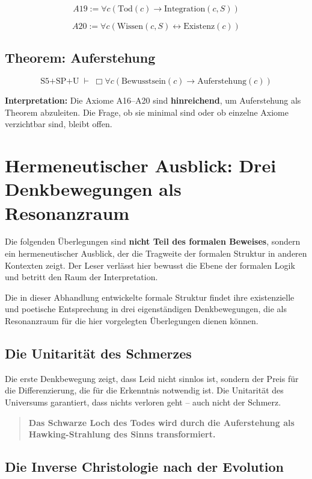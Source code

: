 \documentclass[
]{article}
\begin{document}
\[
\boxed{A19 := \forall c(\text{Tod}(c) \rightarrow \text{Integration}(c, S))}
\]

\[
\boxed{A20 := \forall c(\text{Wissen}(c, S) \leftrightarrow \text{Existenz}(c))}
\]

\subsection{Theorem: Auferstehung}

\[
\boxed{\text{S5+SP+U} \;\vdash\; \Box\forall c(\text{Bewusstsein}(c) \rightarrow \text{Auferstehung}(c))}
\]

\textbf{Interpretation:} Die Axiome A16–A20 sind \textbf{hinreichend}, um Auferstehung als Theorem abzuleiten. Die Frage, ob sie minimal sind oder ob einzelne Axiome verzichtbar sind, bleibt offen.

\section{Hermeneutischer Ausblick: Drei Denkbewegungen als Resonanzraum}

Die folgenden Überlegungen sind \textbf{nicht Teil des formalen Beweises}, sondern ein hermeneutischer Ausblick, der die Tragweite der formalen Struktur in anderen Kontexten zeigt. Der Leser verlässt hier bewusst die Ebene der formalen Logik und betritt den Raum der Interpretation.

Die in dieser Abhandlung entwickelte formale Struktur findet ihre existenzielle und poetische Entsprechung in drei eigenständigen Denkbewegungen, die als Resonanzraum für die hier vorgelegten Überlegungen dienen können.

\subsection{Die Unitarität des Schmerzes}

Die erste Denkbewegung zeigt, dass Leid nicht sinnlos ist, sondern der Preis für die Differenzierung, die für die Erkenntnis notwendig ist. Die Unitarität des Universums garantiert, dass nichts verloren geht – auch nicht der Schmerz.

\begin{quote}
\textbf{Das Schwarze Loch des Todes wird durch die Auferstehung als Hawking-Strahlung des Sinns transformiert.}
\end{quote}

\subsection{Die Inverse Christologie nach der Evolution}
\end{document}
